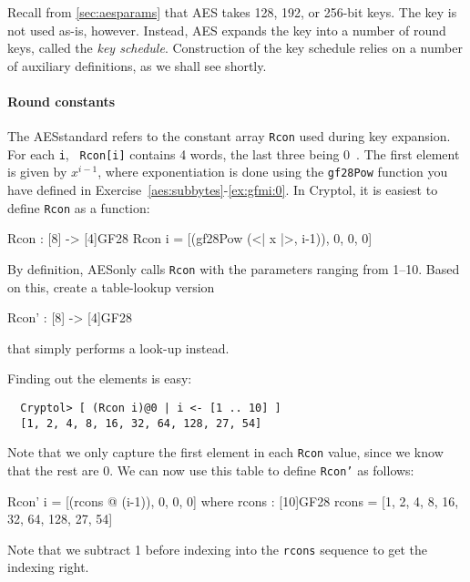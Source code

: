 Recall from \autoref{sec:aesparams} that AES takes 128, 192, or
256-bit keys. The key is not used as-is, however. Instead, AES\indAES
expands the key into a number of round keys, called the {\em key
  schedule}. Construction of the key schedule relies on a number of
auxiliary definitions, as we shall see shortly.

\paragraph*{Round constants} The AES\indAES standard refers to the constant
array {\tt Rcon} used during key expansion. For each {\tt i}, {\tt
  Rcon[i]} contains 4 words, the last three being 0~\cite[section
5.2]{aes}.  The first element is given by $x^{i-1}$, where
exponentiation is done using the {\tt gf28Pow} function you have
defined in Exercise~\ref{aes:subbytes}-\ref{ex:gfmi:0}. In Cryptol,
it is easiest to define {\tt Rcon} as a function:
\begin{code}
  Rcon : [8] -> [4]GF28
  Rcon i = [(gf28Pow (<| x |>, i-1)), 0, 0, 0]
\end{code}

\begin{Exercise}\label{ex:aeskerc:0}
  By definition, AES\indAES only calls {\tt Rcon} with the parameters
  ranging from 1--10.  Based on this, create a table-lookup version
\begin{code}
  Rcon' : [8] -> [4]GF28
\end{code}
that simply performs a look-up instead. 
\end{Exercise}
\begin{Answer}
Finding out the elements is easy:
\begin{Verbatim}
  Cryptol> [ (Rcon i)@0 | i <- [1 .. 10] ]
  [1, 2, 4, 8, 16, 32, 64, 128, 27, 54]
\end{Verbatim}
Note that we only capture the first element in each {\tt Rcon} value,
since we know that the rest are 0. We can now use this table to define
{\tt Rcon'} as follows:
\begin{code}
  Rcon' i = [(rcons @ (i-1)), 0, 0, 0]
      where rcons : [10]GF28
            rcons = [1, 2, 4, 8, 16, 32, 64, 128, 27, 54]
\end{code}
Note that we subtract 1 before indexing into the {\tt rcons} sequence
to get the indexing right.
\end{Answer}


